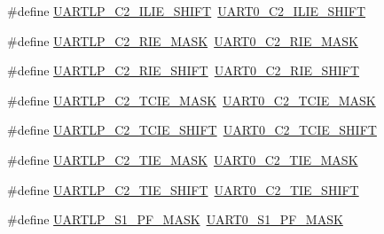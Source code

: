 \begin{DoxyCompactItemize}
\item 
\#define \hyperlink{group___backward___compatibility___symbols_gab90e873c1b169d382f638afbf736e569}{U\+A\+R\+T\+L\+P\+\_\+\+C2\+\_\+\+I\+L\+I\+E\+\_\+\+S\+H\+I\+FT}~\hyperlink{group___u_a_r_t0___register___masks_ga4ab02fff3512ff6b92e5aecd62049c39}{U\+A\+R\+T0\+\_\+\+C2\+\_\+\+I\+L\+I\+E\+\_\+\+S\+H\+I\+FT}
\item 
\#define \hyperlink{group___backward___compatibility___symbols_gac3c789d6eafa116990b4ead8ff24877c}{U\+A\+R\+T\+L\+P\+\_\+\+C2\+\_\+\+R\+I\+E\+\_\+\+M\+A\+SK}~\hyperlink{group___u_a_r_t0___register___masks_ga9e2ddb43bcd4b9554e0c7a6fa0402efb}{U\+A\+R\+T0\+\_\+\+C2\+\_\+\+R\+I\+E\+\_\+\+M\+A\+SK}
\item 
\#define \hyperlink{group___backward___compatibility___symbols_gaad81a706759dd0db2ca7d73b26c54329}{U\+A\+R\+T\+L\+P\+\_\+\+C2\+\_\+\+R\+I\+E\+\_\+\+S\+H\+I\+FT}~\hyperlink{group___u_a_r_t0___register___masks_gac718305b3ddae3fe258e2735f8a074bf}{U\+A\+R\+T0\+\_\+\+C2\+\_\+\+R\+I\+E\+\_\+\+S\+H\+I\+FT}
\item 
\#define \hyperlink{group___backward___compatibility___symbols_ga96867f1c59f537c310fa32eb0722e075}{U\+A\+R\+T\+L\+P\+\_\+\+C2\+\_\+\+T\+C\+I\+E\+\_\+\+M\+A\+SK}~\hyperlink{group___u_a_r_t0___register___masks_ga8d9362d72300e5dcee78580a773b60c9}{U\+A\+R\+T0\+\_\+\+C2\+\_\+\+T\+C\+I\+E\+\_\+\+M\+A\+SK}
\item 
\#define \hyperlink{group___backward___compatibility___symbols_ga49ccd6611c47944d69e14ec4ad710c0f}{U\+A\+R\+T\+L\+P\+\_\+\+C2\+\_\+\+T\+C\+I\+E\+\_\+\+S\+H\+I\+FT}~\hyperlink{group___u_a_r_t0___register___masks_ga019da6a7871d38f10460ea7ff32b54cc}{U\+A\+R\+T0\+\_\+\+C2\+\_\+\+T\+C\+I\+E\+\_\+\+S\+H\+I\+FT}
\item 
\#define \hyperlink{group___backward___compatibility___symbols_ga8b17a7eada73c13310ee58bd2f2791d5}{U\+A\+R\+T\+L\+P\+\_\+\+C2\+\_\+\+T\+I\+E\+\_\+\+M\+A\+SK}~\hyperlink{group___u_a_r_t0___register___masks_ga57c06364890b354bb04a5f968fc95c42}{U\+A\+R\+T0\+\_\+\+C2\+\_\+\+T\+I\+E\+\_\+\+M\+A\+SK}
\item 
\#define \hyperlink{group___backward___compatibility___symbols_ga151bc121eebeab1b1e5e3b989d513f18}{U\+A\+R\+T\+L\+P\+\_\+\+C2\+\_\+\+T\+I\+E\+\_\+\+S\+H\+I\+FT}~\hyperlink{group___u_a_r_t0___register___masks_ga3d54c6b6f2942f117b23a3dd9b53ec2e}{U\+A\+R\+T0\+\_\+\+C2\+\_\+\+T\+I\+E\+\_\+\+S\+H\+I\+FT}
\item 
\#define \hyperlink{group___backward___compatibility___symbols_ga5e7d9c4c91cbaa076c560376f15f6da1}{U\+A\+R\+T\+L\+P\+\_\+\+S1\+\_\+\+P\+F\+\_\+\+M\+A\+SK}~\hyperlink{group___u_a_r_t0___register___masks_gaec8a65a2e60f3455e64b085accacb3ef}{U\+A\+R\+T0\+\_\+\+S1\+\_\+\+P\+F\+\_\+\+M\+A\+SK}

\end{DoxyCompactItemize}
